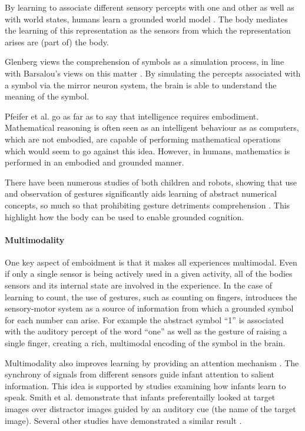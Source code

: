 By learning to associate different sensory percepts with one and other as well as with world states, humans learn a grounded world model \cite{barsalou2008grounded}. The body mediates the learning of this representation as the sensors from which the representation arises are (part of) the body. 

Glenberg \cite{glenberg2015few} views the comprehension of symbols as a simulation process, in line with Barsalou's views on this matter \cite{barsalou2008grounded}. By simulating the percepts associated with a symbol via the mirror neuron system, the brain is able to understand the meaning of the symbol.


Pfeifer et al. \cite{pfeifer2006body} go as far as to say that intelligence requires embodiment. Mathematical reasoning is often seen as an intelligent behaviour as as computers, which are not embodied, are capable of performing mathematical operations which would seem to go against this idea. However, in humans, mathematics is performed in an embodied and grounded manner. 

There have been numerous studies of both children and robots, showing that use and observation of gestures significantly aids learning of abstract numerical concepts, so much so that prohibiting gesture detriments comprehension \cite{Goldin-MeadowSusan2015Fata, de2014making, rucinski2012robotic}. This highlight how the body can be used to enable grounded cognition.

\paragraph{Multimodality}
One key aspect of emboidment is that it makes all experiences multimodal. Even if only a single sensor is being actively used in a given activity, all of the bodies sensors and its internal state are involved in the experience. 
In the case of learning to count, the use of gestures, such as counting on fingers, introduces the sensory-motor system as a source of information from which a grounded symbol for each number can arise. For example the abstract symbol ``1'' is associated with the auditory percept of the word ``one'' as well as the gesture of raising a single finger, creating a rich, multimodal encoding of the symbol in the brain. 

Multimodality also improves learning by providing an attention mechanism \cite{bahrick2000intersensory}. The synchrony of signals from different sensors guide infant attention to salient information. This idea is supported by studies examining how infants learn to speak.  Smith et al. \cite{smith2008infants} demonstrate that infants preferentailly looked at target images over distractor images guided by an auditory cue (the name of the target image). Several other studies have demonstrated a similar result \cite{walker2010preverbal, fischer2011multi, scott20122, slater1999intermodal}.


